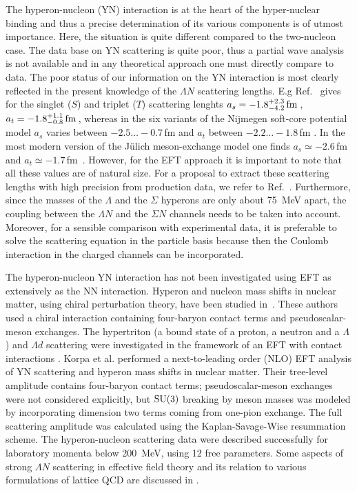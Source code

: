 \documentclass[aps,rmp,nofootinbib,twocolumn,floatfix]{revtex4}
\newcommand{\beq}{\begin{equation}}
\newcommand{\eeq}{\end{equation}}
\begin{document}
The hyperon-nucleon (YN) interaction is at the heart of the hyper-nuclear
binding and thus a precise determination of its various components is
of utmost importance. Here, the situation is quite different compared
to the two-nucleon case. The data base on YN scattering is quite poor,
thus a partial wave analysis is not available and in any theoretical
approach one must directly compare to data. The poor status of our information
on the YN interaction is most clearly reflected in the present knowledge
of the $\Lambda N$ scattering lengths. E.g Ref.~\cite{Alexander:1969cx} 
gives for the singlet ($S$)  and triplet ($T$) scattering lenghts 
$a_s = -1.8_{-4.2}^{+2.3}\,{\rm fm}\,$,
$a_t = -1.8_{-0.8}^{+1.1}\,{\rm fm}\,$,
whereas in the six variants of the Nijmegen soft-core potential
model $a_s$ varies between $-2.5 \ldots -0.7\,$fm and $a_t$ between
$-2.2 \ldots -1.8\,$fm \cite{Rijken:1998yy}. In the
most modern version of the J\"ulich meson-exchange model
one finds $a_s \simeq -2.6\,$fm and $a_t \simeq
-1.7\,$fm~\cite{Haidenbauer:2005zh}. However, for the EFT approach
it is important to note that all these values are of natural size.
For a proposal to extract these
scattering lengths with high precision from production data, we
refer to Ref.~\cite{Gasparyan:2003cc}. Furthermore, since the masses
of the $\Lambda$ and the $\Sigma$ hyperons  are only about 75~MeV apart, 
the  coupling between the $\Lambda N$ and the $\Sigma N$ channels needs to
be taken into account. Moreover, for a sensible comparison with experimental
data,  it is preferable to solve the scattering equation in the particle
basis because then the Coulomb interaction in the charged channels can
be incorporated.


The hyperon-nucleon YN interaction has not been investigated using EFT as
extensively as the NN interaction. Hyperon and nucleon mass shifts in
nuclear matter, using chiral perturbation theory, have been studied 
in~\cite{Savage:1995kv}. These authors used a chiral interaction 
containing four-baryon contact
terms and pseudoscalar-meson exchanges. The hypertriton (a bound state
of a proton, a neutron and a $\Lambda$) and $\Lambda
d$ scattering were investigated in the framework of an EFT with contact 
interactions \cite{Hammer:2001ng}. Korpa et al. \cite{Korpa:2001au} performed a
next-to-leading order (NLO) EFT analysis of
YN scattering and hyperon mass shifts in nuclear matter. Their tree-level
amplitude contains four-baryon contact terms; pseudoscalar-meson exchanges
were not considered explicitly, but ${\rm SU(3)}$ breaking by meson masses
was modeled by incorporating dimension two terms coming from one-pion
exchange. The full scattering amplitude was calculated using the
Kaplan-Savage-Wise resummation scheme. The hyperon-nucleon scattering
data were described successfully for laboratory momenta below 200~MeV, using
12 free parameters. Some aspects of strong $\Lambda N$ scattering in effective
field theory and its relation to various formulations of lattice QCD are
discussed in  \cite{Beane:2003yx}. 
\end{document}
